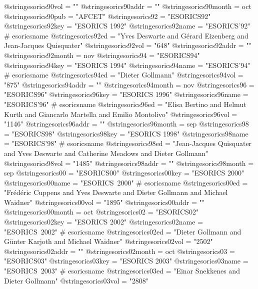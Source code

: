 @string{esorics90vol =          ""}
@string{esorics90addr =         ""}
@string{esorics90month =        oct}
@string{esorics90pub =          "AFCET"}
@string{esorics92 =             "ESORICS92"}
@string{esorics92key =          "ESORICS 1992"}
@string{esorics92name =         "ESORICS'92" # esoricsname}
@string{esorics92ed =           "Yves Deswarte and G{\'e}rard Eizenberg and Jean-Jacques Quisquater"}
@string{esorics92vol =          "648"}
@string{esorics92addr =         ""}
@string{esorics92month =        nov}
@string{esorics94 =             "ESORICS94"}
@string{esorics94key =          "ESORICS 1994"}
@string{esorics94name =         "ESORICS'94" # esoricsname}
@string{esorics94ed =           "Dieter Gollmann"}
@string{esorics94vol =          "875"}
@string{esorics94addr =         ""}
@string{esorics94month =        nov}
@string{esorics96 =             "ESORICS96"}
@string{esorics96key =          "ESORICS 1996"}
@string{esorics96name =         "ESORICS'96" # esoricsname}
@string{esorics96ed =           "Elisa Bertino and Helmut Kurth and Giancarlo Martella and Emilio Montolivo"}
@string{esorics96vol =          "1146"}
@string{esorics96addr =         ""}
@string{esorics96month =        sep}
@string{esorics98 =             "ESORICS98"}
@string{esorics98key =          "ESORICS 1998"}
@string{esorics98name =         "ESORICS'98" # esoricsname}
@string{esorics98ed =           "Jean-Jacques Quisquater and Yves Deswarte and Catherine Meadows and Dieter Gollmann"}
@string{esorics98vol =          "1485"}
@string{esorics98addr =         ""}
@string{esorics98month =        sep}
@string{esorics00 =             "ESORICS00"}
@string{esorics00key =          "ESORICS 2000"}
@string{esorics00name =         "ESORICS~2000" # esoricsname}
@string{esorics00ed =           "Fr{\'e}d{\'e}ric Cuppens and Yves Deswarte and Dieter Gollmann and Michael Waidner"}
@string{esorics00vol =          "1895"}
@string{esorics00addr =         ""}
@string{esorics00month =        oct}
@string{esorics02 =             "ESORICS02"}
@string{esorics02key =          "ESORICS 2002"}
@string{esorics02name =         "ESORICS~2002" # esoricsname}
@string{esorics02ed =           "Dieter Gollmann and G{\"u}nter Karjoth and Michael Waidner"}
@string{esorics02vol =          "2502"}
@string{esorics02addr =         ""}
@string{esorics02month =        oct}
@string{esorics03 =             "ESORICS03"}
@string{esorics03key =          "ESORICS 2003"}
@string{esorics03name =         "ESORICS~2003" # esoricsname}
@string{esorics03ed =           "Einar Snekkenes and Dieter Gollmann"}
@string{esorics03vol =          "2808"}
